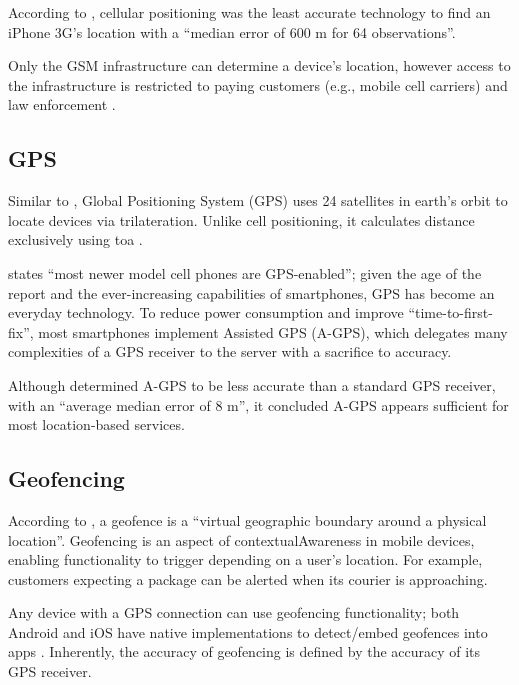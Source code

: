 According to \cite{locationComparison}, cellular
positioning was the least accurate technology to find an
iPhone 3G's location with a \enquote{median error of 600 m
  for 64 observations}.

Only the GSM infrastructure can determine a device's
location, however access to the infrastructure is
restricted to paying customers (e.g., mobile cell carriers)
and law enforcement \parencite{howCellTowerTriWorks}.

\subsection{GPS} \label{ss:gps}

Similar to ,
Global Positioning System (GPS) uses 24 satellites in
earth's orbit to locate devices via \gls{trilateration}.
Unlike cell positioning, it calculates distance exclusively
using \gls{toa} \parencite{suveryOfCellPos}.

\cite{locationComparison} states \enquote{most newer model
  cell phones are GPS-enabled}; given the age of the report
and the ever-increasing capabilities of smartphones, GPS
has become an everyday technology.
To reduce power consumption and improve
\enquote{time-to-first-fix}, most smartphones implement
Assisted GPS (A-GPS), which delegates many complexities of
a GPS receiver to the server with a sacrifice to accuracy.

Although \cite{locationComparison} determined A-GPS to be
less accurate than a standard GPS receiver, with an
\enquote{average median error of 8 m}, it concluded A-GPS
appears sufficient for most location-based services.

\subsection{Geofencing}

According to \cite{whatIsGeofencing}, a geofence is a
\enquote{virtual geographic boundary around a physical
  location}.
Geofencing is an aspect of \gls{contextualAwareness} in
mobile devices, enabling functionality to trigger depending
on a user's location.
For example, customers expecting a package can be alerted
when its courier is approaching.

Any device with a GPS connection can use geofencing
functionality; both Android and iOS have native
implementations to detect/embed geofences into apps
\parencite{androidGeofencingApi,iosGeofencingApi}.
Inherently, the accuracy of geofencing is defined by the
accuracy of its GPS receiver.

